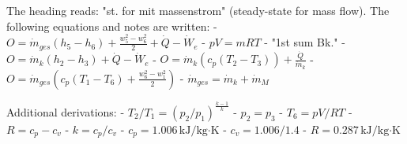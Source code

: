 The heading reads: "st. for mit massenstrom" (steady-state for mass flow).  
The following equations and notes are written:  
- \( O = \dot{m}_{ges} \left( h_5 - h_6 \right) + \frac{w_5^2 - w_6^2}{2} + \dot{Q} - \dot{W}_e \)  
- \( pV = mRT \)  
- "1st sum Bk."  
- \( O = \dot{m}_k \left( h_2 - h_3 \right) + \dot{Q} - \dot{W}_e \)  
- \( O = \dot{m}_k \left( c_p \left( T_2 - T_3 \right) \right) + \frac{\dot{Q}}{\dot{m}_k} \)  
- \( O = \dot{m}_{ges} \left( c_p \left( T_1 - T_6 \right) + \frac{w_6^2 - w_1^2}{2} \right) \)  
- \( \dot{m}_{ges} = \dot{m}_k + \dot{m}_M \)  

Additional derivations:  
- \( T_2 / T_1 = \left( p_2 / p_1 \right)^{\frac{k-1}{k}} \)  
- \( p_2 = p_3 \)  
- \( T_6 = pV / RT \)  
- \( R = c_p - c_v \)  
- \( k = c_p / c_v \)  
- \( c_p = 1.006 \, \text{kJ/kg·K} \)  
- \( c_v = 1.006 / 1.4 \)  
- \( R = 0.287 \, \text{kJ/kg·K} \)